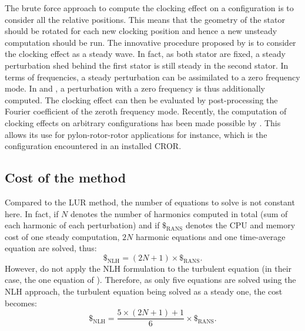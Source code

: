 The brute force approach to compute the clocking effect on a
configuration is to consider all the relative positions. This means
that the geometry of the stator should be rotated for each new 
clocking position and hence a new unsteady computation should be 
run. The innovative procedure proposed by 
\citet{He2002} is to consider the clocking effect as a steady wave.
In fact, as both stator are fixed, a steady perturbation
shed behind the first stator is still steady in the second stator.
In terms of frequencies, a steady perturbation
can be assimilated to a zero frequency mode. 
In \citet{He2002} and \citet{Vilmin2009}, 
a perturbation with a zero frequency
is thus additionally computed. The clocking effect can then be evaluated by
post-processing the Fourier coefficient of the zeroth frequency mode.
Recently, the computation of clocking effects on
arbitrary configurations has been made possible
by \citet{Vilmin2013a}. This allows its use for 
pylon-rotor-rotor applications for instance, which
is the configuration encountered in an installed CROR.

\subsection{Cost of the method}
Compared to the LUR method, the number of equations to solve is 
not constant here. In fact, if $N$ denotes the number of harmonics
computed in total (sum of each harmonic of each perturbation)
and if $\mathdollar_{\text{RANS}}$ 
denotes the CPU and memory cost of
one steady computation, $2N$ harmonic equations and 
one time-average equation
are solved, thus:
\begin{equation}
	\mathdollar_{\text{NLH}} = (2N+1) \times \mathdollar_{\text{RANS}}.
\end{equation}
However, \citet{Vilmin2006} do not apply the NLH formulation
to the turbulent equation (in their case, 
the one equation of \citet{Spalart1992}). Therefore,
as only five equations are solved using the NLH approach, the 
turbulent equation being solved as a steady one,
the cost becomes:
\begin{equation}
	\mathdollar_{\text{NLH}} = \frac{5 \times (2N+1) + 1}{6} \times \mathdollar_{\text{RANS}}.
\end{equation}

